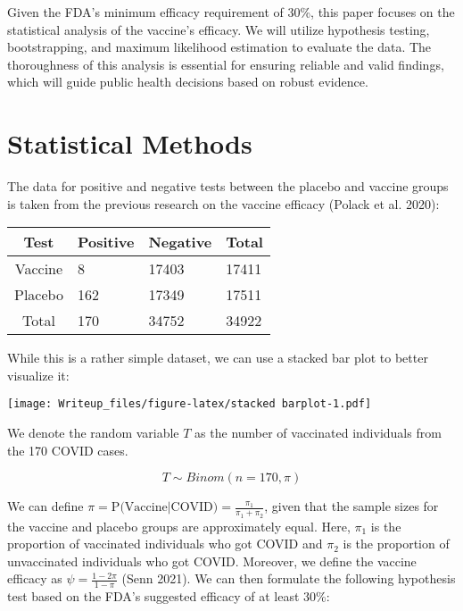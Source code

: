 \documentclass[
  11pt,
]{article}
\begin{document}
Given the FDA's minimum efficacy requirement of 30\%, this paper focuses
on the statistical analysis of the vaccine's efficacy. We will utilize
hypothesis testing, bootstrapping, and maximum likelihood estimation to
evaluate the data. The thoroughness of this analysis is essential for
ensuring reliable and valid findings, which will guide public health
decisions based on robust evidence.

\hypertarget{statistical-methods}{%
\section{Statistical Methods}\label{statistical-methods}}

The data for positive and negative tests between the placebo and vaccine
groups is taken from the previous research on the vaccine efficacy
(Polack et al. 2020):

\begin{table}[h]
    \centering
    \begin{tabular}{c|p{1in}|p{1in}|p{1in}}
    Test & Positive & Negative & Total \\ \hline
    Vaccine & 8 & 17403 & 17411 \\ \hline
    Placebo & 162 & 17349 & 17511 \\ \hline
    Total & 170 & 34752 & 34922 \\ \hline
    \end{tabular}
\end{table}

\newpage

While this is a rather simple dataset, we can use a stacked bar plot to
better visualize it:

\texttt{[image: Writeup\_files/figure-latex/stacked barplot-1.pdf]}

We denote the random variable \(T\) as the number of vaccinated
individuals from the 170 COVID cases.

\[ T \sim Binom(n = 170,\pi) \]

We can define
\(\pi = \textrm{P(Vaccine|COVID)} = \frac{\pi_1}{\pi_1 + \pi_2}\), given
that the sample sizes for the vaccine and placebo groups are
approximately equal. Here, \(\pi_1\) is the proportion of vaccinated
individuals who got COVID and \(\pi_2\) is the proportion of
unvaccinated individuals who got COVID. Moreover, we define the vaccine
efficacy as \(\psi = \frac{1-2\pi}{1-\pi}\) (Senn 2021). We can then
formulate the following hypothesis test based on the FDA's suggested
efficacy of at least 30\%:
\end{document}
